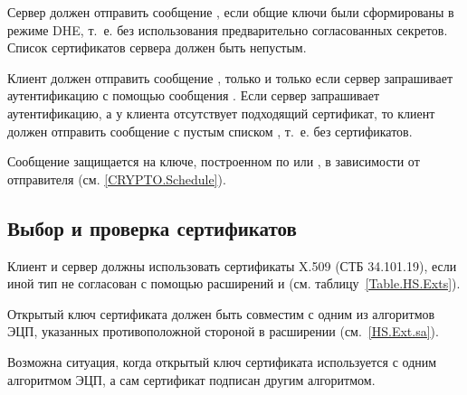 
Сервер должен отправить сообщение , если 
общие ключи были сформированы в режиме DHE, т.~е. без использования 
предварительно согласованных секретов.
%
Список сертификатов сервера должен быть непустым.

Клиент должен отправить сообщение , только и только если
сервер запрашивает аутентификацию с помощью сообщения 
.
%
Если сервер запрашивает аутентификацию, а у клиента отсутствует подходящий 
сертификат, то клиент должен отправить сообщение  
с пустым списком , т.~е. без сертификатов.


Сообщение  защищается на ключе, построенном по 
 или , 
в зависимости от отправителя (см. \ref{CRYPTO.Schedule}).

\subsection{Выбор и проверка сертификатов}\label{HS.Auth.Cert} 

Клиент и сервер должны использовать сертификаты X.509 (СТБ 34.101.19), если 
иной тип не согласован с помощью расширений 
и  
(см. таблицу~\ref{Table.HS.Exts}).

Открытый ключ сертификата должен быть совместим с одним из алгоритмов ЭЦП, 
указанных противоположной стороной в расширении 
 (см.~\ref{HS.Ext.sa}).

\begin{note*}
Возможна ситуация, когда открытый ключ сертификата используется с одним 
алгоритмом ЭЦП, а сам сертификат подписан другим алгоритмом.
\end{note*}

